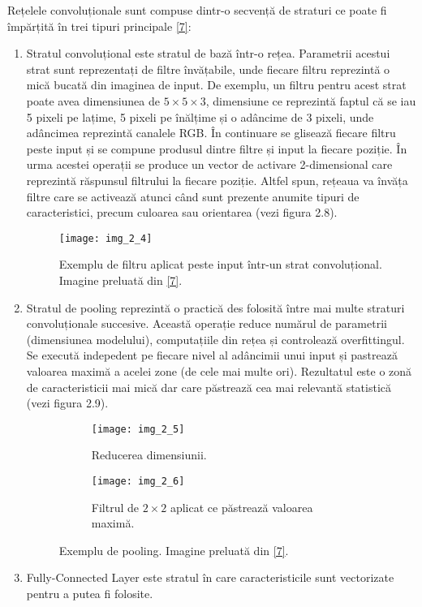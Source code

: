 Rețelele convoluționale sunt compuse dintr-o secvență de straturi ce poate fi împărțită în trei tipuri principale \hyperlink{cs231n}{[7]}:
\begin{enumerate}
  \item Stratul convoluțional este stratul de bază într-o rețea. Parametrii acestui strat sunt reprezentați de filtre învățabile, unde fiecare filtru reprezintă o mică bucată din imaginea de input. De exemplu, un filtru pentru acest strat poate avea dimensiunea de $5 \times 5 \times 3$, dimensiune ce reprezintă faptul că se iau 5 pixeli pe lațime, 5 pixeli pe înălțime și o adâncime de 3 pixeli, unde adâncimea reprezintă canalele RGB. În continuare se glisează fiecare filtru peste input și se compune produsul dintre filtre și input la fiecare poziție. În urma acestei operații se produce un vector de activare 2-dimensional care reprezintă răspunsul filtrului la fiecare poziție. Altfel spun, rețeaua va învăța filtre care se activează atunci când sunt prezente anumite tipuri de caracteristici, precum culoarea sau orientarea (vezi figura 2.8).
\begin{figure}[!h]
	\centering
	\texttt{[image: img\_2\_4]}
	\caption[Exemplu de filtru aplicat peste input]{Exemplu de filtru aplicat peste input într-un strat convoluțional. Imagine preluată din \hyperlink{datameetsmedia}{[7]}.}
\end{figure}   
  
  \item Stratul de pooling reprezintă o practică des folosită între mai multe straturi convoluționale succesive. Această operație reduce numărul de parametrii (dimensiunea modelului), computațiile din rețea și controlează overfittingul. Se execută indepedent pe fiecare nivel al adâncimii unui input și pastrează valoarea maximă a acelei zone (de cele mai multe ori). Rezultatul este o zonă de caracteristicii mai mică dar care păstrează cea mai relevantă statistică (vezi figura 2.9).
\begin{figure}[!tbp]
  \begin{subfigure}[b]{0.4\textwidth}
    \texttt{[image: img\_2\_5]}
    \caption{Reducerea dimensiunii.}
    \label{fig:f1}
  \end{subfigure}
  \hfill
  \begin{subfigure}[b]{0.4\textwidth}
    \texttt{[image: img\_2\_6]}
    \caption{Filtrul de $2\times2$ aplicat ce păstrează valoarea maximă.}
    \label{fig:f2}
  \end{subfigure}
  \caption[Exemplu de pooling]{Exemplu de pooling. Imagine preluată din \hyperlink{datameetsmedia}{[7]}.}
\end{figure}
  
  \item Fully-Connected Layer este stratul în care caracteristicile sunt vectorizate pentru a putea fi folosite.
\end{enumerate}

